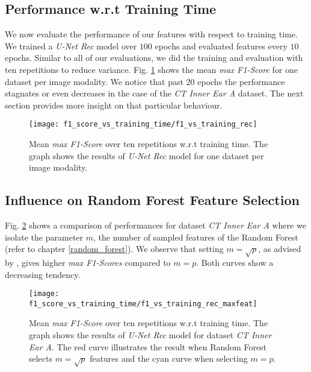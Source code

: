 \clearpage
\subsection{Performance w.r.t Training Time} \label{ch:perf_vs_training}
We now evaluate the performance of our features with respect to training time. We trained a \textit{U-Net Rec} model over $100$ epochs and evaluated features every $10$ epochs. Similar to all of our evaluations, we did the training and evaluation with ten repetitions to reduce variance. Fig. \ref{fig:perf_vs_training} shows the mean \textit{max F1-Score} for one dataset per image modality. We notice that past $20$ epochs the performance stagnates or even decreases in the case of the \textit{CT Inner Ear A} dataset. The next section provides more insight on that particular behaviour.
\vspace{30pt}

\begin{figure}[!htbp]
  \centering
  {
    \texttt{[image: f1\_score\_vs\_training\_time/f1\_vs\_training\_rec]}
  }
  \caption[Feature quality vs training time of U-Net Rec model]{Mean \textit{max F1-Score} over ten repetitions w.r.t training time. The graph shows the results of \textit{U-Net Rec} model for one dataset per image modality.}
  \label{fig:perf_vs_training}
\end{figure}

\clearpage
\subsection{Influence on Random Forest Feature Selection} \label{ch:ch_infl_feat_selection}
Fig. \ref{fig:perf_vs_training_maxfeat} shows a comparison of performances for dataset \textit{CT Inner Ear A} where we isolate the parameter $m$, the number of sampled features of the Random Forest (refer to chapter \ref{random_forest}). We observe that setting $m=\sqrt{p}$, as advised by \cite[Ch. 15]{Hastie2009}, gives higher \textit{max F1-Scores} compared to $m=p$.
Both curves show a decreasing tendency.
\vspace{10pt}

\begin{figure}[!htbp]
  \centering
  {
    \texttt{[image: f1\_score\_vs\_training\_time/f1\_vs\_training\_rec\_maxfeat]}
  }
  \caption[Feature quality vs training time of U-Net Rec model]{Mean \textit{max F1-Score} over ten repetitions w.r.t training time. The graph shows the results of \textit{U-Net Rec} model for dataset \textit{CT Inner Ear A}. The red curve illustrates the result when Random Forest selects $m=\sqrt{p}$ features and the cyan curve when selecting $m=p$.}
  \label{fig:perf_vs_training_maxfeat}
\end{figure}

